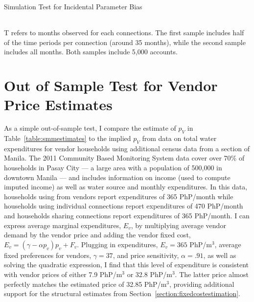 \documentclass[12pt]{article}
\begin{document}
\begin{appendices}
\begin{table}
\centering
\caption{Simulation Test for Incidental Parameter Bias}\label{table:incidentalparameters}
\\
\footnotesize{T refers to months observed for each connections.  The first sample includes half of the time periods per connection (around 35 months), while the second sample includes all months.  Both samples include 5,000 accounts.}
\end{table}



\section{Out of Sample Test for Vendor Price Estimates}\label{appendix:vendorpriceestimates}




As a simple out-of-sample test, I compare the estimate of $p_V$ in Table~\ref{table:smmestimates} to the implied $p_V$ from data on total water expenditures for vendor households using additional census data from a section of Manila. The 2011 Community Based Monitoring System data cover over 70\% of households in Pasay City --- a large area with a population of 500,000 in downtown Manila --- and includes information on income (used to compute imputed income) as well as water source and monthly expenditures.  In this data, households using from vendors report expenditures of 365 PhP/month while households using individual connections report expenditures of 470 PhP/month and households sharing connections report expenditures of 365 PhP/month.  I can express average marginal expenditures, $E_v$, by multiplying average vendor demand by the vendor price and adding the vendor fixed cost, $E_v = (\gamma - \alpha p_v) p_v + F_v$.  Plugging in expenditures, $E_v =365$ PhP/$\text{m}^{3}$, average fixed preferences for vendors, $\gamma=37$, and price sensitivity, $\alpha=.91$, as well as solving the quadratic expression, I find that this level of expenditure is consistent with vendor prices of either 7.9 PhP/$\text{m}^{3}$ or 32.8 PhP/$\text{m}^{3}$.  The latter price almost perfectly matches the estimated price of 32.85 PhP/$\text{m}^3$, providing additional support for the structural estimates from Section~\ref{section:fixedcostestimation}.




\end{appendices}
\end{document}
